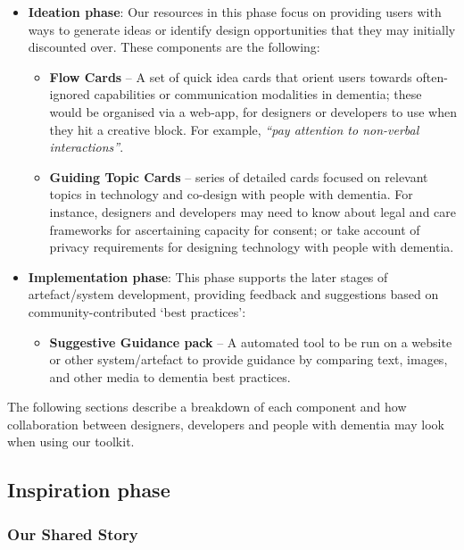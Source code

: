 \begin{itemize}
    \item \textbf{Ideation phase}: Our resources in this phase focus on providing users with ways to generate ideas or identify design opportunities that they may initially discounted over. These components are the following:
    \begin{itemize}
        \item \textbf{Flow Cards} – A set of quick idea cards that orient users towards often-ignored capabilities or communication modalities in dementia; these would be organised via a web-app, for designers or developers to use when they hit a creative block. For example, \textit{“pay attention to non-verbal interactions”}.
        \item \textbf{Guiding Topic Cards} – series of detailed cards focused on relevant topics in technology and co-design with people with dementia. For instance, designers and developers may need to know about legal and care frameworks for ascertaining capacity for consent; or take account of privacy requirements for designing technology with people with dementia.
    \end{itemize}
\end{itemize}

\begin{itemize}
    \item \textbf{Implementation phase}: This phase supports the later stages of artefact/system development, providing feedback and suggestions based on community-contributed ‘best practices’: 
    \begin{itemize}
        \item \textbf{Suggestive Guidance pack} – A automated tool to be run on a website or other system/artefact to provide guidance by comparing text, images, and other media to dementia best practices. 
    \end{itemize}
\end{itemize}

The following sections describe a breakdown of each component and how collaboration between designers, developers and people with dementia may look when using our toolkit. 

\subsection{Inspiration phase}
\subsubsection{Our Shared Story}

